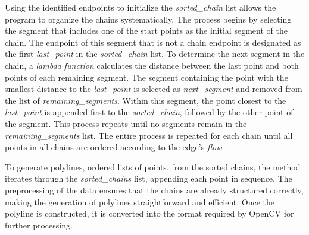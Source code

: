 Using the identified endpoints to initialize the \textit{sorted\_chain} list allows the program to organize the chains systematically. The process begins by selecting the segment that includes one of the start points as the initial segment of the chain. The endpoint of this segment that is not a chain endpoint is designated as the first \textit{last\_point} in the \textit{sorted\_chain} list. To determine the next segment in the chain, a \textit{lambda function} calculates the distance between the last point and both points of each remaining segment. The segment containing the point with the smallest distance to the \textit{last\_point} is selected as \textit{next\_segment} and removed from the list of \textit{remaining\_segments}. Within this segment, the point closest to the \textit{last\_point} is appended first to the \textit{sorted\_chain}, followed by the other point of the segment. This process repeats until no segments remain in the \textit{remaining\_segments} list. The entire process is repeated for each chain until all points in all chains are ordered according to the edge's \textit{flow}.

To generate polylines, ordered lists of points, from the sorted chains, the method iterates through the \textit{sorted\_chains} list, appending each point in sequence. The preprocessing of the data ensures that the chains are already structured correctly, making the generation of polylines straightforward and efficient. Once the polyline is constructed, it is converted into the format required by OpenCV for further processing.

